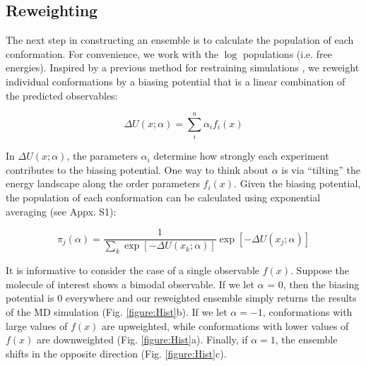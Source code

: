 \documentclass[journal=jacsat,manuscript=article]{achemso}
\begin{document}
\subsection{Reweighting}

The next step in constructing an ensemble is to calculate the population of each conformation.  For convenience, we work with the $\log$ populations (i.e. free energies). Inspired by a previous method for restraining simulations \cite{chodera2012}, we reweight individual conformations by a biasing potential that is a linear combination of the predicted observables:

$$\Delta U(x;\alpha) = \sum_i^n \alpha_i f_i(x)$$

In $\Delta U(x;\alpha)$, the parameters $\alpha_i$ determine how strongly each experiment contributes to the biasing potential.  One way to think about $\alpha$ is via ``tilting'' the energy landscape along the order parameters $f_i(x)$.  Given the biasing potential, the population of each conformation can be calculated using exponential averaging (see Appx. S1):

$$\pi_j(\alpha) = \frac{1}{\sum_k \exp[-\Delta U(x_k;\alpha)]} \exp[-\Delta U(x_j;\alpha)]$$

It is informative to consider the case of a single observable $f(x)$.  Suppose the molecule of interest shows a bimodal observable.  If we let $\alpha$ = 0, then the biasing potential is $0$ everywhere and our reweighted ensemble simply returns the results of the MD simulation (Fig. \ref{figure:Hist}b).  If we let $\alpha = -1$, conformations with large values of $f(x)$ are upweighted, while conformations with lower values of $f(x)$ are downweighted (Fig. \ref{figure:Hist}a).  Finally, if $\alpha = 1$, the ensemble shifts in the opposite direction (Fig. \ref{figure:Hist}c).  
\end{document}
